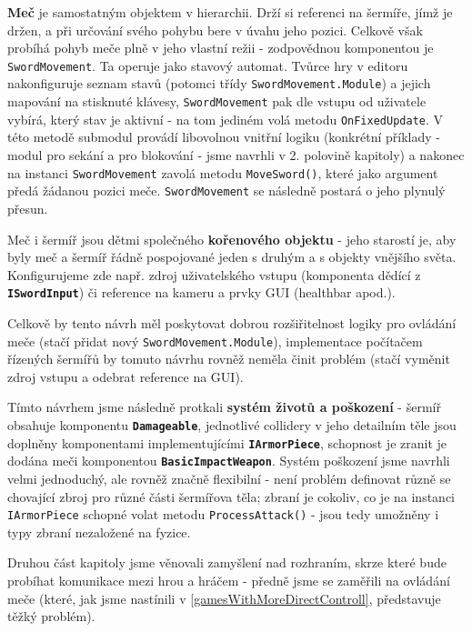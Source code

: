 \textbf{Meč} je samostatným objektem v hierarchii. Drží si referenci na šermíře, jímž je držen, a při určování svého pohybu bere v úvahu jeho pozici. Celkově však probíhá pohyb meče plně v jeho vlastní režii - zodpovědnou komponentou je \texttt{SwordMovement}. Ta operuje jako stavový automat. Tvůrce hry v editoru nakonfiguruje seznam stavů (potomci třídy \texttt{SwordMovement.Module}) a jejich mapování na stisknuté klávesy, \texttt{SwordMovement} pak dle vstupu od uživatele vybírá, který stav je aktivní - na tom jediném volá metodu \texttt{OnFixedUpdate}. V této metodě submodul provádí libovolnou vnitřní logiku (konkrétní příklady - modul pro sekání a pro blokování - jsme navrhli v 2. polovině kapitoly) a nakonec na instanci \texttt{SwordMovement} zavolá metodu \texttt{MoveSword()}, které jako argument předá žádanou pozici meče. \texttt{SwordMovement} se následně postará o jeho plynulý přesun. 

Meč i šermíř jsou dětmi společného \textbf{kořenového objektu} - jeho starostí je, aby byly meč a šermíř řádně pospojované jeden s druhým a s objekty vnějšího světa. Konfigurujeme zde např. zdroj uživatelského vstupu (komponenta dědící z \textbf{\texttt{ISwordInput}}) či reference na kameru a prvky GUI (healthbar apod.).

Celkově by tento návrh měl poskytovat dobrou rozšiřitelnost logiky pro ovládání meče (stačí přidat nový \texttt{SwordMovement.Module}), implementace počítačem řízených šermířů by tomuto návrhu rovněž neměla činit problém (stačí vyměnit zdroj vstupu a odebrat reference na GUI).

Tímto návrhem jsme následně protkali \textbf{systém životů a poškození} - šermíř obsahuje komponentu \textbf{\texttt{Damageable}}, jednotlivé collidery v jeho detailním těle jsou doplněny komponentami implementujícími \textbf{\texttt{IArmorPiece}}, schopnost je zranit je dodána meči komponentou \textbf{\texttt{BasicImpactWeapon}}. Systém poškození jsme navrhli velmi jednoduchý, ale rovněž značně flexibilní - není problém definovat různě se chovající zbroj pro různé části šermířova těla; zbraní je cokoliv, co je na instanci \texttt{IArmorPiece} schopné volat metodu \texttt{ProcessAttack()} - jsou tedy umožněny i typy zbraní nezaložené na fyzice.

\bigbreak

Druhou část kapitoly jsme věnovali zamyšlení nad rozhraním, skrze které bude probíhat komunikace mezi hrou a hráčem - předně jsme se zaměřili na ovládání meče (které, jak jsme nastínili v \ref{gamesWithMoreDirectControll}, představuje těžký problém).


